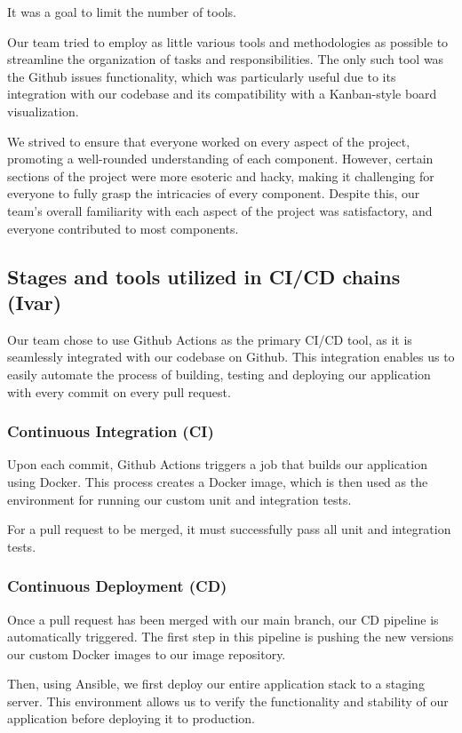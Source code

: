 \documentclass{article}
\begin{document}
{It was a goal to limit the number of tools.

Our team tried to employ as little various tools and methodologies as possible to streamline the organization of tasks and responsibilities. The only such tool was the Github issues functionality, which was particularly useful due to its integration with our codebase and its compatibility with a Kanban-style board visualization.

We strived to ensure that everyone worked on every aspect of the project, promoting a well-rounded understanding of each component. However, certain sections of the project were more esoteric and hacky, making it challenging for everyone to fully grasp the intricacies of every component. Despite this, our team's overall familiarity with each aspect of the project was satisfactory, and everyone contributed to most components.


\subsection{Stages and tools utilized in CI/CD chains (Ivar)}
Our team chose to use Github Actions as the primary CI/CD tool, as it is seamlessly integrated with our codebase on Github. This integration enables us to easily automate the process of building, testing and deploying our application with every commit on every pull request.

\subsubsection{Continuous Integration (CI)}
Upon each commit, Github Actions triggers a job that builds our application using Docker. This process creates a Docker image, which is then used as the environment for running our custom unit and integration tests.

For a pull request to be merged, it must successfully pass all unit and integration tests.

\subsubsection{Continuous Deployment (CD)}

Once a pull request has been merged with our main branch, our CD pipeline is automatically triggered. 
The first step in this pipeline is pushing the new versions our custom Docker images to our image repository. 

Then, using Ansible, we first deploy our entire application stack to a staging server. This environment allows us to verify the functionality and stability of our application before deploying it to production.

}
\end{document}
